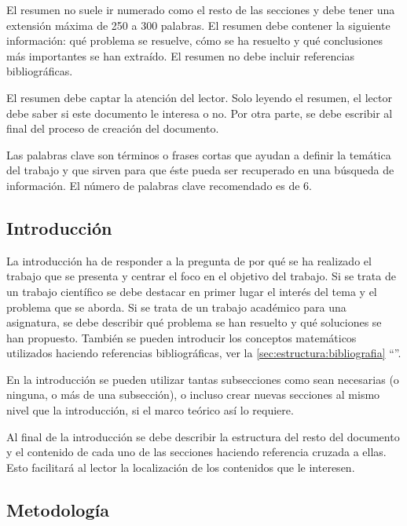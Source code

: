 \documentclass[11pt]{article}
\begin{document}
El resumen no suele ir numerado como el resto de las secciones y debe tener una extensión máxima de 250 a 300 palabras. El resumen debe contener la siguiente información: qué problema se resuelve, cómo se ha resuelto y qué conclusiones más importantes se han extraído. El resumen no debe incluir referencias bibliográficas.

El resumen debe captar la atención del lector. Solo leyendo el resumen, el lector debe saber si este documento le interesa o no. Por otra parte, se debe escribir al final del proceso de creación del documento.

Las palabras clave son términos o frases cortas que ayudan a definir la temática del trabajo y que sirven para que éste pueda ser recuperado en una búsqueda de información. El número de palabras clave recomendado es de 6.

\subsection{Introducción}

La introducción ha de responder a la pregunta de por qué se ha realizado el trabajo que se presenta y centrar el foco en el objetivo del trabajo. Si se trata de un trabajo científico se debe destacar en primer lugar el interés del tema y el problema que se aborda. Si se trata de un trabajo académico para una asignatura, se debe describir qué problema se han resuelto y qué soluciones se han propuesto. También se pueden introducir los conceptos matemáticos utilizados haciendo referencias bibliográficas, ver la \autoref{sec:estructura:bibliografia} ``''. 

En la introducción se pueden utilizar tantas subsecciones como sean necesarias (o ninguna, o más de una subsección), o incluso crear nuevas secciones al mismo nivel que la introducción, si el marco teórico así lo requiere.

Al final de la introducción se debe describir la estructura del resto del documento y el contenido de cada uno de las secciones haciendo referencia cruzada a ellas. Esto facilitará al lector la localización de los contenidos que le interesen.

\subsection{Metodología}
\end{document}
